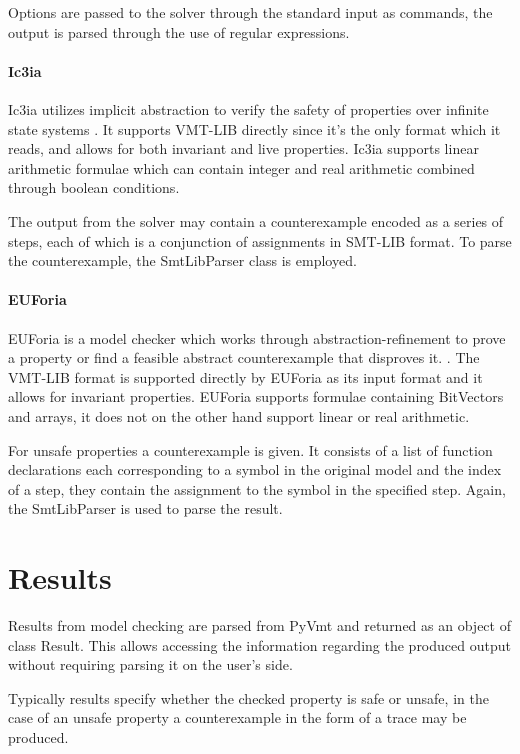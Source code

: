 Options are passed to the solver through the standard input as commands, the output is parsed through the use of regular expressions.

\paragraph*{Ic3ia}
Ic3ia utilizes implicit abstraction to verify the safety of properties over infinite state systems \cite{10.1007/978-3-319-41528-4_15}.
It supports VMT-LIB directly since it's the only format which it reads, and allows for both invariant and live properties.
Ic3ia supports linear arithmetic formulae which can contain integer and real arithmetic combined through boolean conditions.

The output from the solver may contain a counterexample encoded as a series of steps, each of which is a conjunction of assignments in SMT-LIB format. To parse the counterexample, the SmtLibParser class is employed.

\paragraph*{EUForia}
EUForia is a model checker which works through abstraction-refinement to prove a property or find a feasible abstract counterexample that disproves it. \cite{10.1007/978-3-030-11245-5_17}.
The VMT-LIB format is supported directly by EUForia as its input format and it allows for invariant properties.
EUForia supports formulae containing BitVectors and arrays, it does not on the other hand support linear or real arithmetic.

For unsafe properties a counterexample is given. It consists of a list of function declarations each corresponding to a symbol in the original model and the index of a step, they contain the assignment to the symbol in the specified step. Again, the SmtLibParser is used to parse the result.


\section{Results}
Results from model checking are parsed from PyVmt and returned as an object of class Result.
This allows accessing the information regarding the produced output without requiring parsing it on the user's side.

Typically results specify whether the checked property is safe or unsafe, in the case of an unsafe property a counterexample in the form of a trace may be produced.

